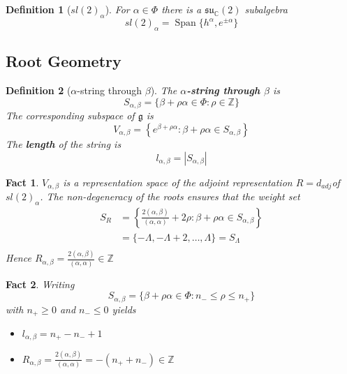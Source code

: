 \documentclass{article}
\newtheorem{definition}{Definition}[subsection]
\newtheorem{fact}{Fact}[subsection]
\DeclareMathOperator{\spn}{Span}
\newcommand{\bam}[1]{\textbf{#1}}
\newcommand{\mf}[1]{\mathfrak{#1}}
\newcommand{\mbb}[1]{\mathbb{#1}}
\newcommand{\set}[1]{\lbrace #1 \rbrace}
\begin{document}
\begin{definition}[$sl(2)_\alpha$]
For $\alpha\in\Phi$ there is a $\mf{su}_\mbb{C}(2)$ subalgebra 
\[
sl(2)_\alpha=\spn\set{  h^\alpha, e^{\pm\alpha} }
\]
\end{definition}


\subsection{Root Geometry}

\begin{definition}[$\alpha$-string through $\beta$]
The \bam{$\alpha$-string through $\beta$} is 
\[
S_{\alpha, \beta}=\set{  \beta+\rho\alpha\in\Phi : \rho\in\mbb{Z}  }
\]
The corresponding subspace of $\mf{g}$ is 
\[
V_{\alpha, \beta}=\left\{ e^{\beta+\rho\alpha} : \beta+\rho\alpha\in S_{\alpha, \beta} \right\}
\]
The \bam{length} of the string is 
\[
l_{\alpha,\beta}=|S_{\alpha,\beta}|
\]
\end{definition}
\begin{fact}
$V_{\alpha, \beta}$ is a representation space of the adjoint representation $R=d_{adj}$of $sl(2)_\alpha$. The non-degeneracy of the roots ensures that the weight set 
\begin{align*}
    S_R &= \left\{ \frac{2(\alpha,\beta)}{(\alpha,\alpha)}+2\rho : \beta+\rho\alpha\in S_{\alpha, \beta} \right\} \\
     &= \set{  -\Lambda,-\Lambda+2,\dots,\Lambda }=S_\Lambda \\
\end{align*}
Hence $R_{\alpha,\beta}=\frac{2(\alpha,\beta)}{(\alpha,\alpha)} \in\mbb{Z}$
\end{fact}

\begin{fact}
Writing
\[
S_{\alpha, \beta}=\set{  \beta+\rho\alpha\in\Phi : n_- \leq \rho \leq n_+  }
\]
with $n_+ \geq 0$ and $n_- \leq 0$ yields
\begin{itemize}
    \item $l_{\alpha,\beta}=n_+-n_-+1$
    \item $R_{\alpha,\beta}=\frac{2(\alpha,\beta)}{(\alpha,\alpha)} = -(n_+ + n_-) \in\mbb{Z}$
\end{itemize}
\end{fact}
\end{document}
